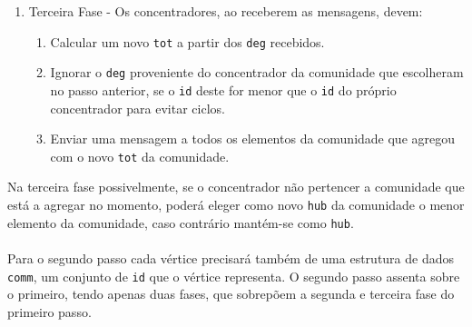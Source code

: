 \documentclass[a4paper,10pt]{report}
\begin{document}
\begin{algorithm}[H]
\begin{minipage}{\textwidth}
\begin{enumerate}
  \item Terceira Fase - Os concentradores, ao receberem as mensagens, devem:
\begin{enumerate}
		\item Calcular um novo \verb|tot| a partir dos \verb|deg| recebidos.
		\item Ignorar o \verb|deg| proveniente do concentrador da comunidade que escolheram no passo anterior, se o \verb|id| deste for menor que o \verb|id| do próprio concentrador para evitar ciclos.

		\item Enviar uma mensagem a todos os elementos da comunidade que agregou com o novo \verb|tot| da comunidade.
\end{enumerate}
\end{enumerate}

	\end{minipage}
\end{algorithm}

Na terceira fase possivelmente, se o concentrador não pertencer a comunidade que está a agregar no momento, poderá eleger como novo \verb|hub| da comunidade o menor elemento da comunidade, caso contrário mantém-se como \verb|hub|.

\paragraph{}
Para o segundo passo cada vértice precisará também de uma estrutura de dados \verb|comm|, um conjunto de \verb|id| que o vértice representa.
O segundo passo assenta sobre o primeiro, tendo apenas duas fases, que sobrepõem a segunda e terceira fase do primeiro passo.
\end{document}
